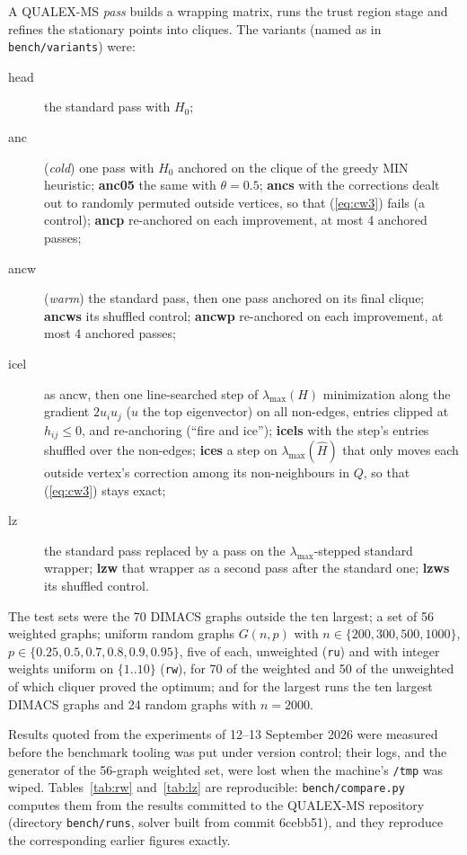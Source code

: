 \documentclass[11pt]{article}
\theoremstyle{definition}
\theoremstyle{remark}
\newcommand{\hH}{\hat{H}}
\newcommand{\lmax}{\lambda_{\max}}
\begin{document}
A QUALEX-MS {\em pass} builds a wrapping matrix, runs the trust region
stage and refines the stationary points into cliques. The variants (named
as in \texttt{bench/variants}) were:
\begin{description}
\item[head] the standard pass with $H_0$;
\item[anc] ({\em cold}) one pass with $H_0$ anchored on the clique of the
greedy MIN heuristic; \textbf{anc05} the same with $\theta=0.5$;
\textbf{ancs} with the corrections dealt out to randomly permuted outside
vertices, so that (\ref{eq:cw3}) fails (a control); \textbf{ancp} re-anchored
on each improvement, at most 4 anchored passes;
\item[ancw] ({\em warm}) the standard pass, then one pass anchored on its
final clique; \textbf{ancws} its shuffled control; \textbf{ancwp} re-anchored
on each improvement, at most 4 anchored passes;
\item[icel] as ancw, then one line-searched step of $\lmax(H)$ minimization
along the gradient $2u_iu_j$ ($u$ the top eigenvector) on all non-edges,
entries clipped at $h_{ij}\leq0$, and re-anchoring (``fire and ice'');
\textbf{icels} with the step's entries shuffled over the non-edges;
\textbf{ices} a step on $\lmax(\hH)$ that only moves each outside vertex's
correction among its non-neighbours in $Q$, so that (\ref{eq:cw3}) stays
exact;
\item[lz] the standard pass replaced by a pass on the $\lmax$-stepped
standard wrapper; \textbf{lzw} that wrapper as a second pass after the
standard one; \textbf{lzws} its shuffled control.
\end{description}
The test sets were the 70 DIMACS graphs outside the ten largest; a set of
56 weighted graphs; uniform random graphs $G(n,p)$ with
$n\in\{200,300,500,1000\}$, $p\in\{0.25,0.5,0.7,0.8,0.9,0.95\}$, five of each,
unweighted (\texttt{ru}) and with integer weights uniform on $\{1..10\}$
(\texttt{rw}), for 70 of the weighted and 50 of the unweighted of which
cliquer \cite{NO03} proved the optimum; and for the largest runs the ten
largest DIMACS graphs and 24 random graphs with $n=2000$.

Results quoted from the experiments of 12--13 September 2026 were measured
before the benchmark tooling was put under version control; their logs,
and the generator of the 56-graph weighted set, were lost when the machine's
\texttt{/tmp} was wiped. Tables~\ref{tab:rw} and~\ref{tab:lz} are
reproducible: \texttt{bench/compare.py} computes them from the results
committed to the QUALEX-MS repository (directory \texttt{bench/runs},
solver built from commit 6cebb51), and they reproduce the corresponding
earlier figures exactly.
\end{document}
